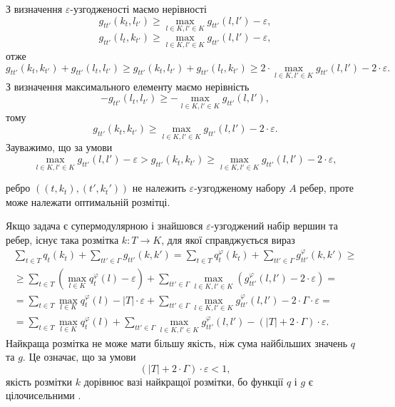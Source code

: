 З визначення $\varepsilon$-узгодженості маємо нерівності
\begin{equation*}
    g_{tt'}(k_t,l_{t'})\geq \max\limits_{l\in K, l'\in K}g_{tt'}(l,l')-\varepsilon,
\end{equation*}
\begin{equation*}
    g_{tt'}(l_t,k_{t'})\geq \max\limits_{l\in K, l'\in K}g_{tt'}(l,l')-\varepsilon,
\end{equation*}
отже 
\begin{equation*}
    g_{tt'}(k_t,k_{t'})+g_{tt'}(l_t,l_{t'})\geq g_{tt'}(k_t,l_{t'})+g_{tt'}(l_t,k_{t'})\geq 2\cdot \max\limits_{l\in K, l'\in K}g_{tt'}(l,l')- 2\cdot \varepsilon.
\end{equation*}
З визначення максимального елементу маємо нерівність
\begin{equation*}
    -g_{tt'}(l_t,l_{t'})\geq -\max\limits_{l\in K, l'\in K}g_{tt'}(l,l'),
\end{equation*}
тому 
\begin{equation*}
    g_{tt'}(k_t,k_{t'})\geq \max\limits_{l\in K, l'\in K}g_{tt'}(l,l') - 2\cdot \varepsilon.
\end{equation*}
Зауважимо, що за умови
\begin{equation*}
    \max\limits_{l\in K, l'\in K}g_{tt'}(l,l') - \varepsilon > g_{tt'}(k_t,k_{t'})\geq \max\limits_{l\in K, l'\in K}g_{tt'}(l,l') - 2\cdot \varepsilon,
\end{equation*}

ребро $((t,k_t),(t',k_t'))$ не належить $\varepsilon$-узгодженому набору $A$ ребер, проте може 
належати оптимальній розмітці.

Якщо задача є супермодулярною і знайшовся $\varepsilon$-узгоджений набір вершин та ребер, існує 
така розмітка $k:T\rightarrow K$, для якої справджується вираз 
\begin{equation*}
    \begin{aligned}
        \sum_{t \in T} q_t(k_t) + \sum_{tt' \in \Gamma} g_{tt'}(k,k')=\sum_{t \in T} q^\varphi_t(k_t) + \sum_{tt' \in \Gamma} g^\varphi_{tt'}(k,k')\geq\\
        \geq \sum_{t \in T} \left( \max_{l\in K} q^\varphi_t(l) -\varepsilon \right) + \sum_{tt' \in \Gamma}  \max\limits_{l\in K, l'\in K} \left( g^\varphi_{tt'}(l,l') - 2\cdot\varepsilon \right)=\\
        = \sum_{t \in T} \max_{l\in K} q^\varphi_t(l) - |T|\cdot\varepsilon  + \sum_{tt' \in \Gamma}  \max\limits_{l\in K, l'\in K} g^\varphi_{tt'}(l,l') - 2\cdot\Gamma\cdot\varepsilon=\\
        = \sum_{t \in T} \max_{l\in K} q^\varphi_t(l) + \sum_{tt' \in \Gamma}  \max\limits_{l\in K, l'\in K} g^\varphi_{tt'}(l,l') - \left( |T|+2\cdot\Gamma \right)\cdot\varepsilon.
    \end{aligned}
\end{equation*}
Найкраща розмітка не може мати більшу якість, ніж сума найбільших значень $q$ та $g$.
Це означає, що за умови 
\begin{equation*}
    (|T|+2\cdot\Gamma)\cdot\varepsilon<1,
\end{equation*}
якість розмітки $k$ дорівнює вазі найкращої розмітки, бо функції $q$ і $g$ є цілочисельними \cite{diffusion_shlezinger}.

